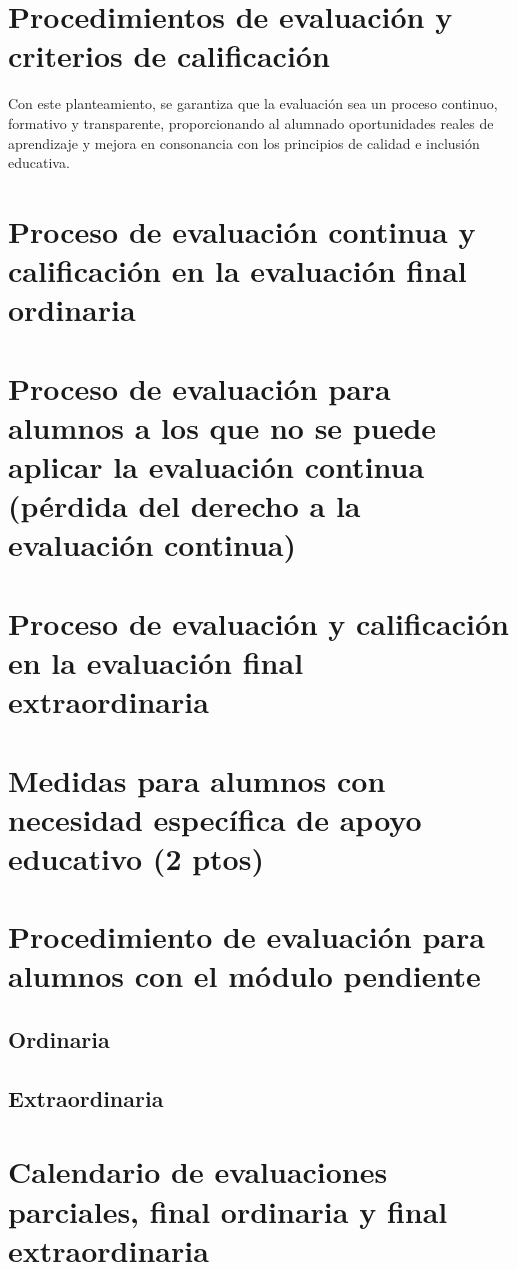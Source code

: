 \section{Procedimientos de evaluación y criterios de calificación}






Con este planteamiento, se garantiza que la evaluación sea un proceso continuo, formativo y transparente, proporcionando al alumnado oportunidades reales de aprendizaje y mejora en consonancia con los principios de calidad e inclusión educativa.


	\section{Proceso de evaluación continua y calificación en la evaluación final ordinaria}

	\section{Proceso de evaluación para alumnos a los que no se puede aplicar la evaluación continua (pérdida del derecho a la evaluación continua)}



	\section{Proceso de evaluación y calificación en la evaluación final extraordinaria}
	\section{Medidas para alumnos con necesidad específica de apoyo educativo (2 ptos)}
	\section{Procedimiento de evaluación para alumnos con el módulo pendiente}

	\subsection{Ordinaria}
	\subsection{Extraordinaria}
	\section{Calendario de evaluaciones parciales, final ordinaria y final extraordinaria}
